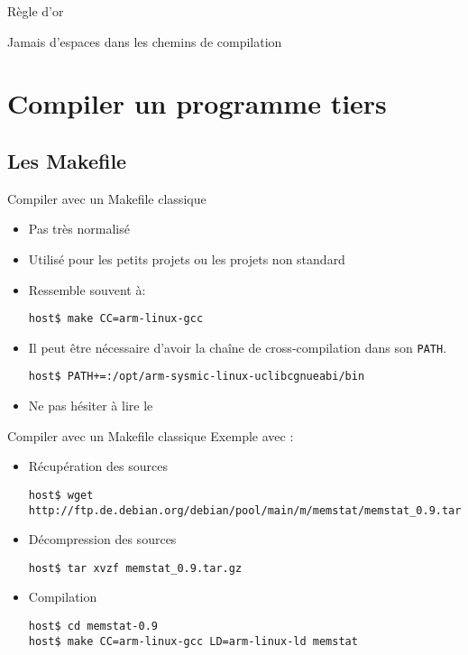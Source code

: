 \begin{frame}[fragile=singleslide]{Règle d'or}
  \begin{center}
    \huge{Jamais d'espaces dans les chemins de compilation}
  \end{center}
\end{frame}

\section{Compiler un programme tiers}

\subsection{Les Makefile}

\begin{frame}[fragile=singleslide]{Compiler avec un Makefile classique}
  \begin{itemize}
  \item Pas très normalisé
  \item Utilisé pour les petits projets ou les projets non standard
  \item Ressemble souvent à:
    \begin{lstlisting}
host$ make CC=arm-linux-gcc
    \end{lstlisting} %
  \item Il peut être nécessaire d'avoir la chaîne de cross-compilation
    dans son \verb+PATH+.
    \begin{lstlisting}
host$ PATH+=:/opt/arm-sysmic-linux-uclibcgnueabi/bin
    \end{lstlisting} %
  \item Ne pas hésiter à lire le 
  \end{itemize}
\end{frame}

\begin{frame}[fragile=singleslide]{Compiler avec un Makefile classique}
  Exemple avec :
  \begin{itemize}
  \item Récupération des sources
    \begin{lstlisting}
host$ wget http://ftp.de.debian.org/debian/pool/main/m/memstat/memstat_0.9.tar.gz
    \end{lstlisting}
  \item Décompression des sources
\begin{lstlisting}
host$ tar xvzf memstat_0.9.tar.gz
\end{lstlisting}
  \item Compilation
\begin{lstlisting}
host$ cd memstat-0.9
host$ make CC=arm-linux-gcc LD=arm-linux-ld memstat
\end{lstlisting} %
  \end{itemize}
\end{frame}

